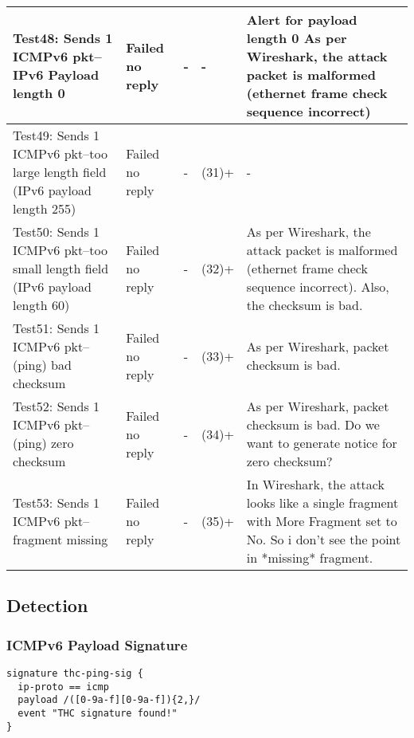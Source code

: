 \documentclass{article}
\begin{document}
\begin{longtable}{|p{1.5in}|p{0.5in}|p{1in}|p{0.8in}|p{1.2in}}
\\ \hline
Test48: Sends 1 ICMPv6 pkt--IPv6 Payload length 0 &
Failed no reply &
- &
- &
Alert for payload length 0
As per Wireshark, the attack packet is malformed (ethernet frame check sequence incorrect) 
\\ \hline
Test49: Sends 1 ICMPv6 pkt--too large length field (IPv6 payload length 255) &
Failed no reply &
- &
(31)+ &
-
\\ \hline
Test50: Sends 1 ICMPv6 pkt--too small length field (IPv6 payload length 60) &
Failed no reply &
- &
(32)+ &
As per Wireshark, the attack packet is malformed (ethernet frame check sequence incorrect). Also, the checksum is bad. 
\\ \hline
Test51: Sends 1 ICMPv6 pkt--(ping) bad checksum &
Failed no reply &
- &
(33)+ &
As per Wireshark, packet checksum is bad. 
\\ \hline
Test52: Sends 1 ICMPv6 pkt--(ping) zero checksum &
Failed no reply &
- &
(34)+ &
As per Wireshark, packet checksum is bad. 
Do we want to generate notice for zero checksum?
\\ \hline
Test53: Sends 1 ICMPv6 pkt--fragment missing &
Failed no reply &
- &
(35)+ &
In Wireshark, the attack looks like a single fragment with More Fragment
	set to No. So i don't see the point in *missing* fragment.
\\ \hline
\end{longtable}

\subsection{Detection}

\subsubsection{ICMPv6 Payload Signature}

\begin{verbatim}
signature thc-ping-sig {
  ip-proto == icmp
  payload /([0-9a-f][0-9a-f]){2,}/
  event "THC signature found!"
}
\end{verbatim}
	 
\end{document}
